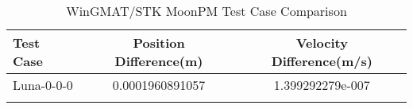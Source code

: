\begin{table}[htbp!]
\centering
\caption{ WinGMAT/STK MoonPM Test Case Comparison}
      \begin{tabular}{lcc}
      \hline\hline
          Test Case & Position Difference(m) & Velocity Difference(m/s) \\
         \hline
         Luna-0-0-0 & 0.0001960891057 & 1.399292279e-007 \\
      \hline\hline
      \label{Table: MoonPM WinGMAT-STK Table} 
\end{tabular}
\end{table}
